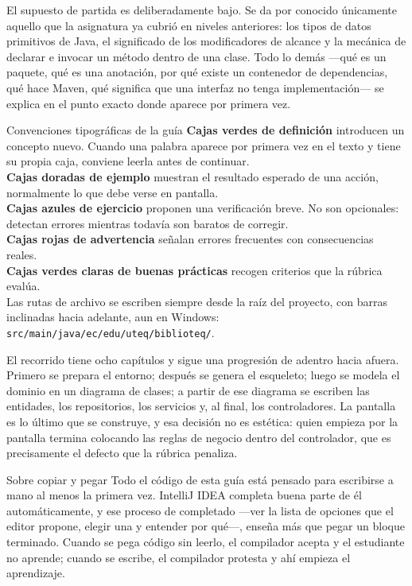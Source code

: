 \documentclass[11pt,a4paper,openany]{book}
\begin{document}
El supuesto de partida es deliberadamente bajo. Se da por conocido únicamente aquello que la asignatura ya cubrió en niveles anteriores: los tipos de datos primitivos de Java, el significado de los modificadores de alcance y la mecánica de declarar e invocar un método dentro de una clase. Todo lo demás ---qué es un paquete, qué es una anotación, por qué existe un contenedor de dependencias, qué hace Maven, qué significa que una interfaz no tenga implementación--- se explica en el punto exacto donde aparece por primera vez.

\begin{cajadefinicion}{Convenciones tipográficas de la guía}
	\textbf{Cajas verdes de definición} introducen un concepto nuevo. Cuando una palabra aparece por primera vez en el texto y tiene su propia caja, conviene leerla antes de continuar.\\[3pt]
	\textbf{Cajas doradas de ejemplo} muestran el resultado esperado de una acción, normalmente lo que debe verse en pantalla.\\[3pt]
	\textbf{Cajas azules de ejercicio} proponen una verificación breve. No son opcionales: detectan errores mientras todavía son baratos de corregir.\\[3pt]
	\textbf{Cajas rojas de advertencia} señalan errores frecuentes con consecuencias reales.\\[3pt]
	\textbf{Cajas verdes claras de buenas prácticas} recogen criterios que la rúbrica evalúa.\\[3pt]
	Las rutas de archivo se escriben siempre desde la raíz del proyecto, con barras inclinadas hacia adelante, aun en Windows: \texttt{src/main/java/ec/edu/uteq/biblioteq/}.
\end{cajadefinicion}

El recorrido tiene ocho capítulos y sigue una progresión de adentro hacia afuera. Primero se prepara el entorno; después se genera el esqueleto; luego se modela el dominio en un diagrama de clases; a partir de ese diagrama se escriben las entidades, los repositorios, los servicios y, al final, los controladores. La pantalla es lo último que se construye, y esa decisión no es estética: quien empieza por la pantalla termina colocando las reglas de negocio dentro del controlador, que es precisamente el defecto que la rúbrica penaliza.

\begin{cajaadvertencia}{Sobre copiar y pegar}
	Todo el código de esta guía está pensado para escribirse a mano al menos la primera vez. IntelliJ IDEA completa buena parte de él automáticamente, y ese proceso de completado ---ver la lista de opciones que el editor propone, elegir una y entender por qué---, enseña más que pegar un bloque terminado. Cuando se pega código sin leerlo, el compilador acepta y el estudiante no aprende; cuando se escribe, el compilador protesta y ahí empieza el aprendizaje.
\end{cajaadvertencia}
\end{document}
